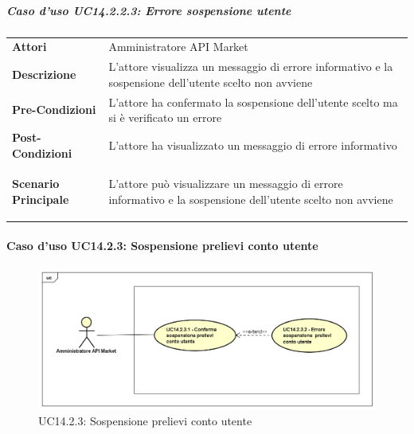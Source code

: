 \subparagraph{Caso d'uso UC14.2.2.3: Errore sospensione utente}
\label{UC14_2_2_3}

\begin{minipage}{\linewidth}
	\begin{tabular}{ l | p{11cm}}
		\hline
		\rowcolor{Gray}
		\multicolumn{2}{c}{UC13.2.2.3 - Errore sospensione utente} \\
		\hline
		\textbf{Attori} & Amministratore API Market \\
		\textbf{Descrizione} & L'attore visualizza un messaggio di errore informativo e la sospensione dell'utente scelto non avviene \\
		\textbf{Pre-Condizioni} & L'attore ha confermato la sospensione dell'utente scelto ma si è verificato un errore \\
		\textbf{Post-Condizioni} & L'attore ha visualizzato un messaggio di errore informativo \\
		\textbf{Scenario Principale} & 
		\begin{enumerate*}[label=(\arabic*.),itemjoin={\newline}]
			\item L'attore può visualizzare un messaggio di errore informativo e la sospensione dell'utente scelto non avviene
		\end{enumerate*}\\
	\end{tabular}
\end{minipage}

\newpage
\paragraph{Caso d'uso UC14.2.3: Sospensione prelievi conto utente}
\label{UC14_2_3}
\begin{figure}[ht]
	\centering
	\includegraphics[scale=0.45]{UML/UC14_2_3.png}
	\caption{UC14.2.3: Sospensione prelievi conto utente}
\end{figure}

